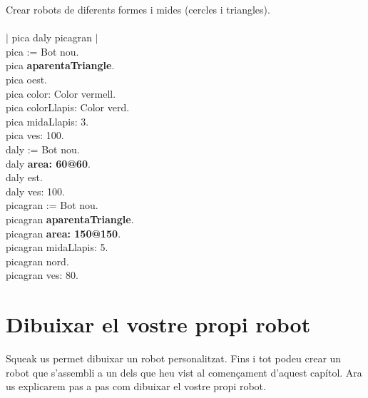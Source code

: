 \begin{script}  Crear robots de diferents formes i mides (cercles i triangles).
\textsf{\upshape
\\
\\$|$ pica daly picagran $|$\\
pica := Bot nou.\\
pica {\bfseries aparentaTriangle}.\\
pica oest.\\
pica color: Color vermell.\\
pica colorLlapis: Color verd.\\
pica midaLlapis: 3.\\
pica ves: 100.\\
daly := Bot nou.\\
daly {\bfseries area: 60@60}.\\
daly est.\\
daly ves: 100.\\
picagran := Bot nou.\\
picagran {\bfseries aparentaTriangle}.\\
picagran {\bfseries area: 150@150}.\\
picagran midaLlapis: 5.\\
picagran nord.\\
picagran ves: 80.\\
}
\label{scr6-4}
\end{script}

\section{Dibuixar el vostre propi robot}
Squeak us permet dibuixar un robot personalitzat. Fins  i tot podeu crear un robot que s'assembli a un dels que heu vist al començament d'aquest capítol. Ara us explicarem pas a pas com dibuixar el vostre propi robot.

